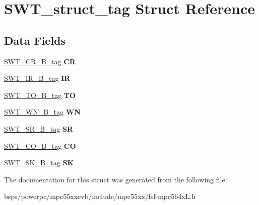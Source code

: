\hypertarget{structSWT__struct__tag}{}\section{S\+W\+T\+\_\+struct\+\_\+tag Struct Reference}
\label{structSWT__struct__tag}
\subsection*{Data Fields}
\begin{DoxyCompactItemize}
\item 
\mbox{\label{structSWT__struct__tag_a9780da4d9ac46639d38773eacc68c97d}} 
\mbox{\hyperlink{unionSWT__CR__32B__tag}{S\+W\+T\+\_\+\+C\+R\+\_\+B\+\_\+tag}} {\bfseries CR}
\item 
\mbox{\label{structSWT__struct__tag_a715adb8a68128b7f8fa844837f4b5d37}} 
\mbox{\hyperlink{unionSWT__IR__32B__tag}{S\+W\+T\+\_\+\+I\+R\+\_\+B\+\_\+tag}} {\bfseries IR}
\item 
\mbox{\label{structSWT__struct__tag_ac9022066dab87268eb6a9606300bb1eb}} 
\mbox{\hyperlink{unionSWT__TO__32B__tag}{S\+W\+T\+\_\+\+T\+O\+\_\+B\+\_\+tag}} {\bfseries TO}
\item 
\mbox{\label{structSWT__struct__tag_ad3b8be99dae935e3b6e87e7869c383fe}} 
\mbox{\hyperlink{unionSWT__WN__32B__tag}{S\+W\+T\+\_\+\+W\+N\+\_\+B\+\_\+tag}} {\bfseries WN}
\item 
\mbox{\label{structSWT__struct__tag_ac2794ebfe446dd8c3cf5673d7f5709e8}} 
\mbox{\hyperlink{unionSWT__SR__32B__tag}{S\+W\+T\+\_\+\+S\+R\+\_\+B\+\_\+tag}} {\bfseries SR}
\item 
\mbox{\label{structSWT__struct__tag_ad537f7a5c33653d4d322352f7a762438}} 
\mbox{\hyperlink{unionSWT__CO__32B__tag}{S\+W\+T\+\_\+\+C\+O\+\_\+B\+\_\+tag}} {\bfseries CO}
\item 
\mbox{\label{structSWT__struct__tag_a44696b854e881a54f2308f47fe389cb9}} 
\mbox{\hyperlink{unionSWT__SK__32B__tag}{S\+W\+T\+\_\+\+S\+K\+\_\+B\+\_\+tag}} {\bfseries SK}
\end{DoxyCompactItemize}


The documentation for this struct was generated from the following file\+:\begin{DoxyCompactItemize}
\item 
bsps/powerpc/mpc55xxevb/include/mpc55xx/fsl-\/mpc564x\+L.\+h\end{DoxyCompactItemize}
